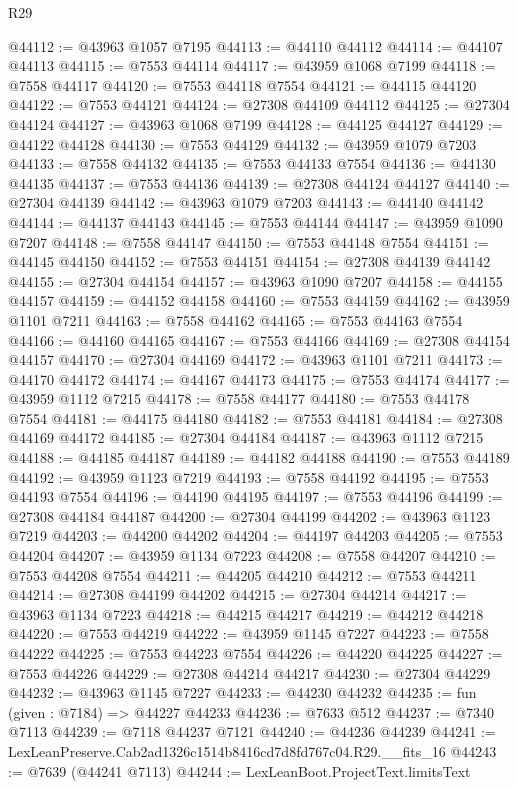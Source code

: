 \begin{lexlean}{R29}
\begin{coremodule}
@44112 := @43963 @1057 @7195
@44113 := @44110 @44112
@44114 := @44107 @44113
@44115 := @7553 @44114
@44117 := @43959 @1068 @7199
@44118 := @7558 @44117
@44120 := @7553 @44118 @7554
@44121 := @44115 @44120
@44122 := @7553 @44121
@44124 := @27308 @44109 @44112
@44125 := @27304 @44124
@44127 := @43963 @1068 @7199
@44128 := @44125 @44127
@44129 := @44122 @44128
@44130 := @7553 @44129
@44132 := @43959 @1079 @7203
@44133 := @7558 @44132
@44135 := @7553 @44133 @7554
@44136 := @44130 @44135
@44137 := @7553 @44136
@44139 := @27308 @44124 @44127
@44140 := @27304 @44139
@44142 := @43963 @1079 @7203
@44143 := @44140 @44142
@44144 := @44137 @44143
@44145 := @7553 @44144
@44147 := @43959 @1090 @7207
@44148 := @7558 @44147
@44150 := @7553 @44148 @7554
@44151 := @44145 @44150
@44152 := @7553 @44151
@44154 := @27308 @44139 @44142
@44155 := @27304 @44154
@44157 := @43963 @1090 @7207
@44158 := @44155 @44157
@44159 := @44152 @44158
@44160 := @7553 @44159
@44162 := @43959 @1101 @7211
@44163 := @7558 @44162
@44165 := @7553 @44163 @7554
@44166 := @44160 @44165
@44167 := @7553 @44166
@44169 := @27308 @44154 @44157
@44170 := @27304 @44169
@44172 := @43963 @1101 @7211
@44173 := @44170 @44172
@44174 := @44167 @44173
@44175 := @7553 @44174
@44177 := @43959 @1112 @7215
@44178 := @7558 @44177
@44180 := @7553 @44178 @7554
@44181 := @44175 @44180
@44182 := @7553 @44181
@44184 := @27308 @44169 @44172
@44185 := @27304 @44184
@44187 := @43963 @1112 @7215
@44188 := @44185 @44187
@44189 := @44182 @44188
@44190 := @7553 @44189
@44192 := @43959 @1123 @7219
@44193 := @7558 @44192
@44195 := @7553 @44193 @7554
@44196 := @44190 @44195
@44197 := @7553 @44196
@44199 := @27308 @44184 @44187
@44200 := @27304 @44199
@44202 := @43963 @1123 @7219
@44203 := @44200 @44202
@44204 := @44197 @44203
@44205 := @7553 @44204
@44207 := @43959 @1134 @7223
@44208 := @7558 @44207
@44210 := @7553 @44208 @7554
@44211 := @44205 @44210
@44212 := @7553 @44211
@44214 := @27308 @44199 @44202
@44215 := @27304 @44214
@44217 := @43963 @1134 @7223
@44218 := @44215 @44217
@44219 := @44212 @44218
@44220 := @7553 @44219
@44222 := @43959 @1145 @7227
@44223 := @7558 @44222
@44225 := @7553 @44223 @7554
@44226 := @44220 @44225
@44227 := @7553 @44226
@44229 := @27308 @44214 @44217
@44230 := @27304 @44229
@44232 := @43963 @1145 @7227
@44233 := @44230 @44232
@44235 := fun (given : @7184) => @44227 @44233
@44236 := @7633 @512
@44237 := @7340 @7113
@44239 := @7118 @44237 @7121
@44240 := @44236 @44239
@44241 := LexLeanPreserve.Cab2ad1326c1514b8416cd7d8fd767c04.R29.__fits_16
@44243 := @7639 (@44241 @7113)
@44244 := LexLeanBoot.ProjectText.limitsText

\end{coremodule}
\end{lexlean}
